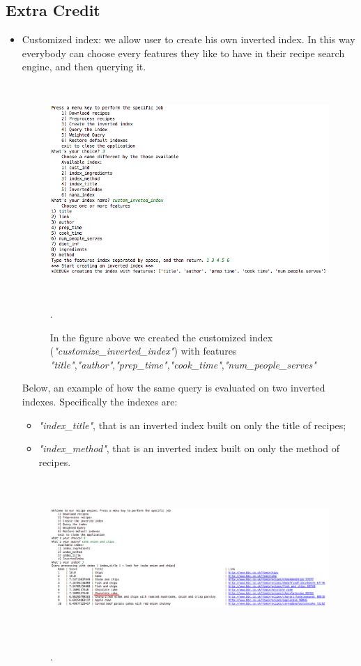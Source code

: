 \documentclass[oneside]{article}			%
\begin{document}
	\subsection{Extra Credit}
	\begin{itemize}
		\item Customized index: we allow user to create his own inverted index. In this way everybody can choose every features they like to have in their recipe search engine, and then querying it.
		\begin{figure}[h]
			\includegraphics[width=12cm, height=8cm]{./report_file/app/create_invete_index.png}\caption{In the figure above we created the customized index (\textit{"customize\_inverted\_index"}) with features \textit{"title"},\textit{"author"},\textit{"prep\_time"},\textit{"cook\_time"},\textit{"num\_people\_serves"} }.
		\end{figure}
		\clearpage
		Below, an example of how the same query is evaluated on two inverted indexes. Specifically the indexes are:
		\begin{itemize}
			\item \textit{"index\_title"}, that is an inverted index built on only the title of recipes;
			\item \textit{"index\_method"}, that is an inverted index built on only the method of recipes.
		\end{itemize}
		\begin{figure}[h]
			\includegraphics[width=18cm, height=6cm]{./report_file/app/query_1.png}\caption{}.

\end{figure}
\end{itemize}
\end{document}
